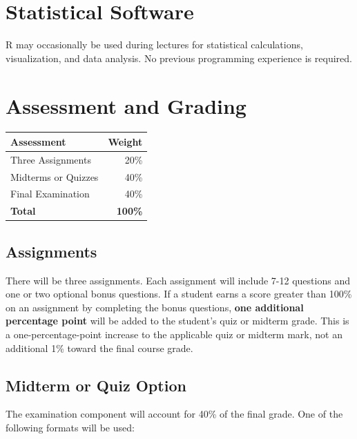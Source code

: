 \documentclass[10pt]{article}
\begin{document}

\section{Statistical Software}
R may occasionally be used during lectures for statistical calculations, visualization, and data analysis. No previous programming experience is required.


\section{Assessment and Grading}

\begin{center}
\begin{tabular}{@{}lr@{}}
\toprule
\textbf{Assessment} & \textbf{Weight} \\
\midrule
Three Assignments  & 20\% \\
Midterms or Quizzes & 40\% \\
Final Examination & 40\% \\
\midrule
\textbf{Total} & \textbf{100\%} \\
\bottomrule
\end{tabular}
\end{center}

\subsection{Assignments} 
There will be three assignments. Each assignment will include 7-12 questions and one or two optional bonus questions. If a student earns a score greater than 100\% on an assignment by completing the bonus questions, \textbf{one additional percentage point} will be added to the student's quiz or midterm grade. This is a one-percentage-point increase to the applicable quiz or midterm mark, not an additional 1\% toward the final course grade.

\subsection{Midterm or Quiz Option}
The examination component will account for 40\% of the final grade. One of the following formats will be used:
\end{document}
